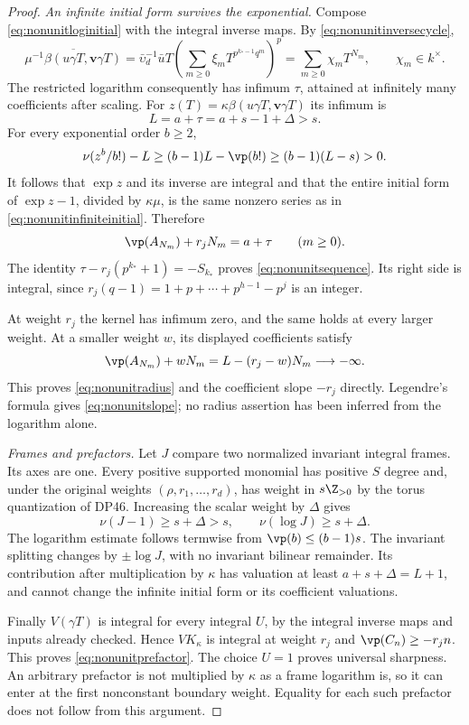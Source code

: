 \begin{proof}
\emph{An infinite initial form survives the exponential.}
Compose \eqref{eq:nonunitloginitial} with the integral inverse maps.
By \eqref{eq:nonunitinversecycle},
\begin{equation}\label{eq:nonunitinfiniteinitial}
 \overline{\mu^{-1}\beta(u\gamma T,\mathbf v\gamma T)}
 =\bar\upsilon_d^{-1}\bar uT
   \left(\sum_{m\ge0}\xi_mT^{p^{k_*-1}q^m}\right)^p
 =\sum_{m\ge0}\chi_mT^{N_m},
 \qquad\chi_m\in k^\times.
\end{equation}
The restricted logarithm consequently has infimum $\tau$, attained at infinitely many coefficients after scaling.
For $z(T)=\kappa\beta(u\gamma T,\mathbf v\gamma T)$ its infimum is
\[
 L=a+\tau=a+s-1+\Delta>s.
\]
For every exponential order $b\ge2$,
\[
 \nu(z^b/b!)-L
       \ge(b-1)L-\vp(b!)
       \ge(b-1)(L-s)>0.
\]
It follows that $\exp z$ and its inverse are integral and that the entire initial form of $\exp z-1$, divided by $\kappa\mu$, is the same nonzero series as in \eqref{eq:nonunitinfiniteinitial}. Therefore
\[
 \vp(A_{N_m})+r_jN_m=a+\tau
       \qquad(m\ge0).
\]
The identity $\tau-r_j(p^{k_*}+1)=-S_{k_*}$ proves
\eqref{eq:nonunitsequence}. Its right side is integral, since
$r_j(q-1)=1+p+\cdots+p^{h-1}-p^j$ is an integer.

At weight $r_j$ the kernel has infimum zero, and the same holds at every larger weight. At a smaller weight $w$, its displayed coefficients satisfy
\[
 \vp(A_{N_m})+wN_m=L-(r_j-w)N_m\longrightarrow-\infty.
\]
This proves \eqref{eq:nonunitradius} and the coefficient slope $-r_j$ directly. Legendre's formula gives \eqref{eq:nonunitslope}; no radius assertion has been inferred from the logarithm alone.

\emph{Frames and prefactors.}
Let $J$ compare two normalized invariant integral frames.
Its axes are one. Every positive supported monomial has positive $S$ degree and, under the original weights $(\rho,r_1,\ldots,r_d)$, has weight in $s\Z_{>0}$ by the torus quantization of DP46.
Increasing the scalar weight by $\Delta$ gives
\[
 \nu(J-1)\ge s+\Delta>s,\qquad
 \nu(\log J)\ge s+\Delta.
\]
The logarithm estimate follows termwise from $\vp(b)\le(b-1)s$.
The invariant splitting changes by $\pm\log J$, with no invariant bilinear remainder. Its contribution after multiplication by $\kappa$ has valuation at least
$a+s+\Delta=L+1$, and cannot change the infinite initial form or its coefficient valuations.

Finally $V(\gamma T)$ is integral for every integral $U$, by the integral inverse maps and inputs already checked. Hence $V K_\kappa$ is integral at weight $r_j$ and
$\vp(C_n)\ge-r_jn$. This proves \eqref{eq:nonunitprefactor}.
The choice $U=1$ proves universal sharpness. An arbitrary prefactor is not multiplied by $\kappa$ as a frame logarithm is, so it can enter at the first nonconstant boundary weight. Equality for each such prefactor does not follow from this argument.
\end{proof}

